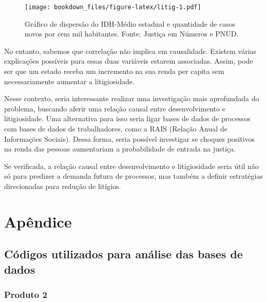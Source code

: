 \documentclass[]{report}
\begin{document}
\begin{figure}[htbp]
\centering
\texttt{[image: bookdown\_files/figure-latex/litig-1.pdf]}
\caption{\label{fig:litig}Gráfico de dispersão do IDH-Médio estadual e
quantidade de casos novos por cem mil habitantes. Fonte: Justiça em
Números e PNUD.}
\end{figure}

No entanto, sabemos que correlação não implica em causalidade. Existem
várias explicações possíveis para essas duas variáveis estarem
associadas. Assim, pode ser que um estado receba um incremento na sua
renda per capita sem necessariamente aumentar a litigiosidade.

Nesse contexto, seria interessante realizar uma investigação mais
aprofundada do problema, buscando aferir uma relação causal entre
desenvolvimento e litigiosidade. Uma alternativa para isso seria ligar
bases de dados de processos com bases de dados de trabalhadores, como a
RAIS (Relação Anual de Informações Sociais). Dessa forma, seria possível
investigar se choques positivos na renda das pessoas aumentariam a
probabilidade de entrada na justiça.

Se verificada, a relação causal entre desenvolvimento e litigiosidade
seria útil não só para predizer a demanda futura de processos, mas
também a definir estratégias direcionadas para redução de litígios.

\chapter{Apêndice}\label{apendice}

\section{Códigos utilizados para análise das bases de
dados}\label{codigos-utilizados-para-analise-das-bases-de-dados}

\subsection{Produto 2}\label{produto-2}
\end{document}
